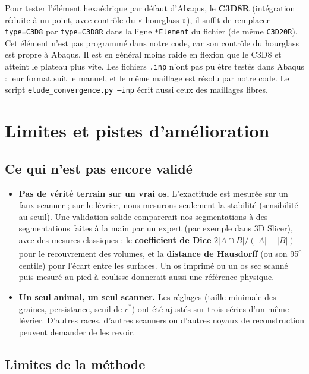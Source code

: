 \documentclass[11pt,a4paper]{article}
\newcommand{\fichier}[1]{\texttt{\small #1}}
\begin{document}
Pour tester l'élément hexaédrique par défaut d'Abaqus, le \textbf{C3D8R} (intégration réduite à un point, avec
contrôle du « hourglass »), il suffit de remplacer \texttt{type=C3D8} par \texttt{type=C3D8R} dans la ligne
\texttt{*Element} du fichier (de même \texttt{C3D20R}). Cet élément n'est pas programmé dans notre code, car son
contrôle du hourglass est propre à Abaqus. Il est en général moins raide en flexion que le C3D8 et atteint le
plateau plus vite. Les fichiers \fichier{.inp} n'ont pas pu être testés dans Abaqus : leur format suit le manuel, et
le même maillage est résolu par notre code. Le script \fichier{etude\_convergence.py --inp} écrit aussi ceux des
maillages libres.


\section{Limites et pistes d'amélioration}
\label{sec-limites}

\subsection{Ce qui n'est pas encore validé}

\begin{itemize}
  \item \textbf{Pas de vérité terrain sur un vrai os.} L'exactitude est mesurée sur un faux scanner ; sur le
  lévrier, nous mesurons seulement la stabilité (sensibilité au seuil). Une validation solide comparerait nos
  segmentations à des segmentations faites à la main par un expert (par exemple dans 3D Slicer), avec des mesures
  classiques : le \textbf{coefficient de Dice} $2|A \cap B| / (|A| + |B|)$ pour le recouvrement des volumes, et la
  \textbf{distance de Hausdorff} (ou son 95\textsuperscript{e} centile) pour l'écart entre les surfaces. Un os imprimé ou
  un os sec scanné puis mesuré au pied à coulisse donnerait aussi une référence physique.
  \item \textbf{Un seul animal, un seul scanner.} Les réglages (taille minimale des graines, persistance, seuil de
  $c^*$) ont été ajustés sur trois séries d'un même lévrier. D'autres races, d'autres scanners ou d'autres noyaux de
  reconstruction peuvent demander de les revoir.
\end{itemize}

\subsection{Limites de la méthode}
\end{document}

